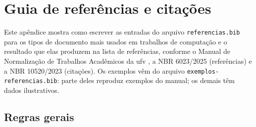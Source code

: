 
\newcommand{\refex}[3]{%
  \par\medskip\noindent\textbf{#3}\par\nopagebreak\smallskip
                  {exemplos-referencias.bib}%
  \par\nopagebreak\smallskip\noindent\textit{Resultado na lista de referências:}\par\nopagebreak
  \begin{SingleSpacing}\noindent\hspace{1cm}\begin{minipage}{0.9\textwidth}%
    \raggedright\fullcite{#2}.\end{minipage}\end{SingleSpacing}\par\medskip}

\chapter{Guia de referências e citações}\label{ap:referencias}

Este apêndice mostra como escrever as entradas do arquivo \texttt{referencias.bib}
para os tipos de documento mais usados em trabalhos de computação e o resultado que
elas produzem na lista de referências, conforme o Manual de Normalização de Trabalhos
Acadêmicos da \ac{ufv} \cite{manualUFV}, a NBR 6023/2025 (referências) e a NBR 10520/2023
(citações). Os exemplos vêm do arquivo \texttt{exemplos-referencias.bib}: parte deles
reproduz exemplos do manual; os demais têm dados ilustrativos.

\section{Regras gerais}

